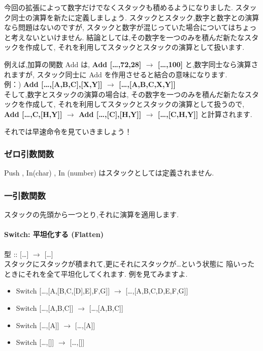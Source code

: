 今回の拡張によって数字だけでなくスタックも積めるようになりました.
スタック同士の演算を新たに定義しましょう.
スタックとスタック,数字と数字との演算なら問題はないのですが,
スタックと数字が混じっていた場合についてはちょっと考えないといけません.
結論としては,その数字を一つのみを積んだ新たなスタックを作成して,
それを利用してスタックとスタックの演算として扱います.

例えば,加算の関数 Add は, \textbf{Add {[}\ldots{},72,28{]}
$\to$ {[}\ldots{},100{]}} と,数字同士なら演算されますが,
スタック同士に Add を作用させると結合の意味になります.\\例：) \textbf{Add
{[}\ldots{},{[}A,B,C{]},{[}X,Y{]}{]} $\to$
{[}\ldots{},{[}A,B,C,X,Y{]}{]}}\\そして,数字とスタックの演算の場合は,
その数字を一つのみを積んだ新たなスタックを作成して,
それを利用してスタックとスタックの演算として扱うので, \textbf{Add
{[}\ldots{},C,{[}H,Y{]}{]} $\to$ Add
{[}\ldots{},{[}C{]},{[}H,Y{]}{]} $\to$
{[}\ldots{},{[}C,H,Y{]}{]}} と計算されます.

それでは早速命令を見ていきましょう！

\subsubsection{ゼロ引数関数}

Push , In(char) , In (number) はスタックとしては定義されません.

\subsubsection{一引数関数}

スタックの先頭から一つとり,それに演算を適用します.

\paragraph{Switch: 平坦化する (Flatten)}

型 :: {[}\ldots{}{]} $\to$
{[}\ldots{}{]}\\スタックにスタックが積まれて,更にそれにスタックが\ldots{}という状態に
陥いったときにそれを全て平坦化してくれます. 例を見てみますよ.

\begin{itemize}
\item
  Switch {[}\ldots{},{[}A,{[}B,C,{[}D{]},E{]},F,G{]}{]} $\to$
  {[}\ldots{},{[}A,B,C,D,E,F,G{]}{]}
\item
  Switch {[}\ldots{},{[}A,B,C{]}{]} $\to$
  {[}\ldots{},{[}A,B,C{]}{]}
\item
  Switch {[}\ldots{},{[}A{]}{]} $\to$ {[}\ldots{},{[}A{]}{]}
\item
  Switch {[}\ldots{},{[}{]}{]} $\to$ {[}\ldots{},{[}{]}{]}
\end{itemize}

